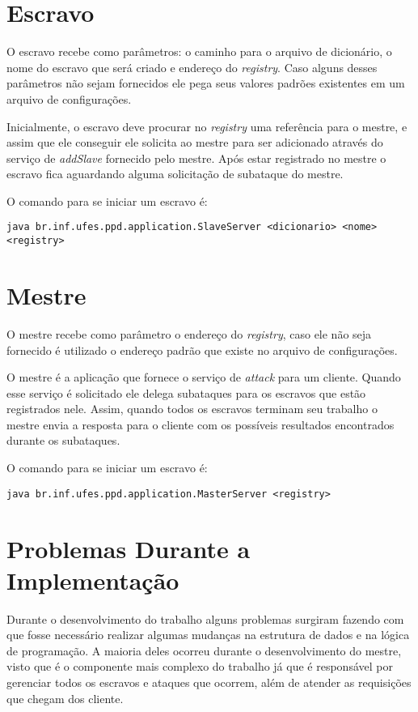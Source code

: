 \documentclass[
	12pt,				%
    oneside,			%
	a4paper,			%
	english,			%
	brazil,				%
	]{abntex2}
\begin{document}
\section{Escravo}
O escravo recebe como parâmetros: o caminho para o arquivo de dicionário, o nome do escravo que será criado e endereço do \textit{registry}. Caso alguns desses parâmetros não sejam fornecidos ele pega seus valores padrões existentes em um arquivo de configurações.

Inicialmente, o escravo deve procurar no \textit{registry} uma referência para o mestre, e assim que ele conseguir ele solicita ao mestre para ser adicionado através do serviço de \textit{addSlave} fornecido pelo mestre. Após estar registrado
no mestre o escravo fica aguardando alguma solicitação de subataque do mestre. 

O comando para se iniciar um escravo é:

\begin{lstlisting}
java br.inf.ufes.ppd.application.SlaveServer <dicionario> <nome> <registry>\end{lstlisting}



\section{Mestre}

O mestre recebe como parâmetro o endereço do \textit{registry}, caso ele não seja fornecido é utilizado o endereço padrão
que existe no arquivo de configurações.

O mestre é a aplicação que fornece o serviço de \textit{attack} para um cliente. Quando esse serviço é solicitado
ele delega subataques para os escravos que estão registrados nele. Assim, quando todos os escravos terminam seu trabalho o 
mestre envia a resposta para o cliente com os possíveis resultados encontrados durante os subataques.

O comando para se iniciar um escravo é:

\begin{lstlisting}
java br.inf.ufes.ppd.application.MasterServer <registry>\end{lstlisting}



\section{Problemas Durante a Implementação}
Durante o desenvolvimento do trabalho alguns problemas surgiram fazendo com que fosse necessário realizar algumas mudanças
na estrutura de dados e na lógica de programação. A maioria deles ocorreu durante o desenvolvimento do mestre, visto que
é o componente mais complexo do trabalho já que é responsável por gerenciar todos os escravos e ataques que ocorrem, além de 
atender as requisições que chegam dos cliente. 
\end{document}

